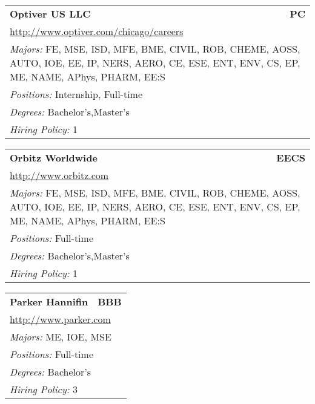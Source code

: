 \documentclass[twoside]{article}
\begin{document}
\begin{center}
\begin{multicols}{3}
\begin{FlushLeft}
\begin{minipage}{\columnwidth}\begin{tabularx}{.95\columnwidth}{Xr}
                 {\Large\bf Optiver US LLC} & {\Large\bf PC}\\
    \multicolumn{2}{p{.95\columnwidth}}{\url{http://www.optiver.com/chicago/careers}}\\
    \multicolumn{2}{p{.95\columnwidth}}{\emph{Majors:} FE, MSE, ISD, MFE, BME, CIVIL, ROB, CHEME, AOSS, AUTO, IOE, EE, IP, NERS, AERO, CE, ESE, ENT, ENV, CS, EP, ME, NAME, APhys, PHARM, EE:S}\\
    \multicolumn{2}{p{.95\columnwidth}}{\emph{Positions:} Internship, Full-time}\\
    \multicolumn{2}{p{.95\columnwidth}}{\emph{Degrees:} Bachelor's,Master's}\\
    \multicolumn{2}{p{.95\columnwidth}}{\emph{Hiring Policy:} 1}\\
    \end{tabularx}
    
\end{minipage}
 
\begin{minipage}{\columnwidth}\begin{tabularx}{.95\columnwidth}{Xr}
                 {\Large\bf Orbitz Worldwide} & {\Large\bf EECS}\\
    \multicolumn{2}{p{.95\columnwidth}}{\url{http://www.orbitz.com}}\\
    \multicolumn{2}{p{.95\columnwidth}}{\emph{Majors:} FE, MSE, ISD, MFE, BME, CIVIL, ROB, CHEME, AOSS, AUTO, IOE, EE, IP, NERS, AERO, CE, ESE, ENT, ENV, CS, EP, ME, NAME, APhys, PHARM, EE:S}\\
    \multicolumn{2}{p{.95\columnwidth}}{\emph{Positions:} Full-time}\\
    \multicolumn{2}{p{.95\columnwidth}}{\emph{Degrees:} Bachelor's,Master's}\\
    \multicolumn{2}{p{.95\columnwidth}}{\emph{Hiring Policy:} 1}\\
    \end{tabularx}
    
\end{minipage}
 
\begin{minipage}{\columnwidth}\begin{tabularx}{.95\columnwidth}{Xr}
                 {\Large\bf Parker Hannifin} & {\Large\bf BBB}\\
    \multicolumn{2}{p{.95\columnwidth}}{\url{http://www.parker.com}}\\
    \multicolumn{2}{p{.95\columnwidth}}{\emph{Majors:} ME, IOE, MSE}\\
    \multicolumn{2}{p{.95\columnwidth}}{\emph{Positions:} Full-time}\\
    \multicolumn{2}{p{.95\columnwidth}}{\emph{Degrees:} Bachelor's}\\
    \multicolumn{2}{p{.95\columnwidth}}{\emph{Hiring Policy:} 3}\\
    \end{tabularx}
    

\end{minipage}
\end{FlushLeft}
\end{multicols}
\end{center}
\end{document}
